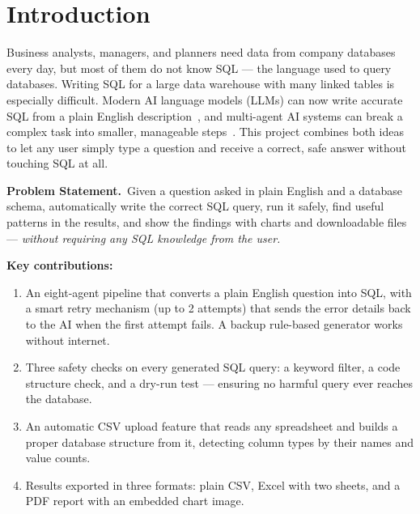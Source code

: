 \documentclass[11pt,a4paper]{article}
\begin{document}
\section{Introduction}

Business analysts, managers, and planners need data from company databases every day, but
most of them do not know SQL — the language used to query databases. Writing SQL for a large
data warehouse with many linked tables is especially difficult. Modern AI language models
(LLMs) can now write accurate SQL from a plain English description~\cite{brown2020gpt3}, and
multi-agent AI systems can break a complex task into smaller, manageable
steps~\cite{yao2022react}. This project combines both ideas to let any user simply type a
question and receive a correct, safe answer without touching SQL at all.

\begin{tcolorbox}[colback=srmlightblue,colframe=srmblue,
  fontupper=\small,top=3pt,bottom=3pt,left=6pt,right=6pt]
\textbf{Problem Statement.}~Given a question asked in plain English and a database schema,
automatically write the correct SQL query, run it safely, find useful patterns in the
results, and show the findings with charts and downloadable files —
\textit{without requiring any SQL knowledge from the user.}
\end{tcolorbox}

\smallskip
\textbf{Key contributions:}
\begin{enumerate}[leftmargin=1.5em,itemsep=0pt,topsep=2pt]
\item An eight-agent pipeline that converts a plain English question into SQL, with a
      smart retry mechanism (up to 2 attempts) that sends the error details back to the AI
      when the first attempt fails. A backup rule-based generator works without internet.
\item Three safety checks on every generated SQL query: a keyword filter, a code structure
      check, and a dry-run test — ensuring no harmful query ever reaches the database.
\item An automatic CSV upload feature that reads any spreadsheet and builds a proper
      database structure from it, detecting column types by their names and value counts.
\item Results exported in three formats: plain CSV, Excel with two sheets, and a PDF
      report with an embedded chart image.
\end{enumerate}
\end{document}
